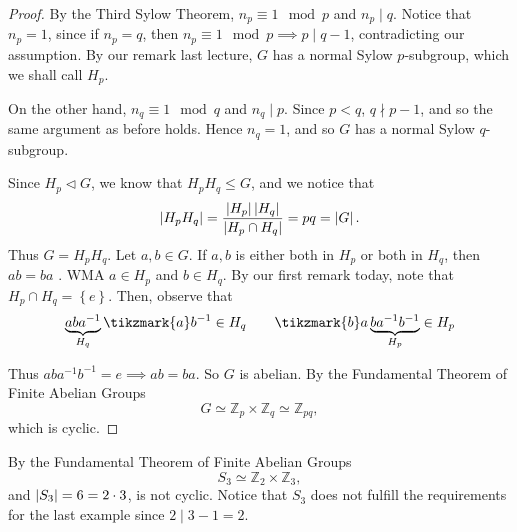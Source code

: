 \documentclass[notoc,notitlepage,nobib]{tufte-book}
\begin{document}
\begin{proof}
  By the Third Sylow Theorem, $n_p \equiv 1 \mod p$ and $n_p \mid q$. Notice that $n_p = 1$,
  since if $n_p = q$, then $n_p \equiv 1 \mod p \implies p \mid q - 1$, contradicting our
  assumption. By our remark last lecture, $G$ has a normal Sylow $p$-subgroup, which we shall
  call $H_p$.

  On the other hand, $n_q \equiv 1 \mod q$ and $n_q \mid p$. Since $p < q$, $q \nmid p - 1$,
  and so the same argument as before holds. Hence $n_q = 1$, and so $G$ has a normal Sylow
  $q$-subgroup.

  Since $H_p \triangleleft G$, we know that $H_p H_q \leq G$, and we notice that
  \begin{equation*}
    \left| H_p H_q \right| = \frac{\left| H_p \right| \left| H_q \right|}{\left| H_p \cap H_q \right|} = pq = \left| G \right|.
  \end{equation*}
  Thus $G = H_p H_q$. Let $a, b \in G$. If $a, b$ is either both in $H_p$ or both in $H_q$,
  then $ab = ba$ .
  WMA $a \in H_p$ and $b \in H_q$. By our first remark today, note that 
  $H_p \cap H_q = \left\{ e \right\}$. Then, observe that
  \begin{equation*}
    \underbrace{aba^{-1}}_{H_q} \tikzmark{a}b^{-1} \in H_q 
    \qquad \tikzmark{b}a \underbrace{ba^{-1}b^{-1}}_{H_p} \in H_p
  \end{equation*}
  Thus $aba^{-1}b^{-1} = e \implies ab = ba$. So $G$ is abelian. By the
  Fundamental Theorem of Finite Abelian Groups
  \begin{equation*}
    G \simeq \mathbb{Z}_p \times \mathbb{Z}_q \simeq \mathbb{Z}_{pq},
  \end{equation*}
  which is cyclic.
\end{proof}

\begin{eg}
  By the Fundamental Theorem of Finite Abelian Groups
  \begin{equation*}
    S_3 \simeq \mathbb{Z}_2 \times \mathbb{Z}_3,
  \end{equation*}
  and $\left| S_3 \right| = 6 = 2 \cdot 3$, is not cyclic. Notice that $S_3$ does not
  fulfill the requirements for the last example since $2 \mid 3 - 1 = 2$.
\end{eg}
\end{document}
